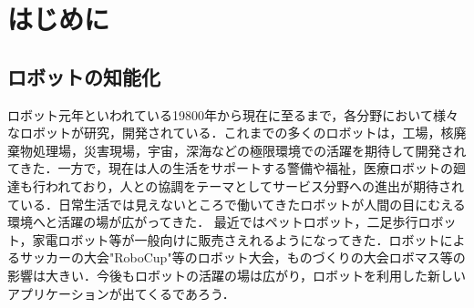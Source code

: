 \chapter{はじめに}
\section{ロボットの知能化}
ロボット元年といわれている19800年から現在に至るまで，各分野において様々なロボットが研究，開発されている．これまでの多くのロボットは，工場，核廃棄物処理場，災害現場，宇宙，深海などの極限環境での活躍を期待して開発されてきた．一方で，現在は人の生活をサポートする警備や福祉，医療ロボットの廻達も行われており，人との協調をテーマとしてサービス分野への進出が期待されている．日常生活では見えないところで働いてきたロボットが人間の目にむえる環境へと活躍の場が広がってきた．
最近ではペットロボット，二足歩行ロボット，家電ロボット等が一般向けに販売さえれるようになってきた．ロボットによるサッカーの大会"RoboCup"等のロボット大会，ものづくりの大会ロボマス等の影響は大きい．今後もロボットの活躍の場は広がり，ロボットを利用した新しいアプリケーションが出てくるであろう．


